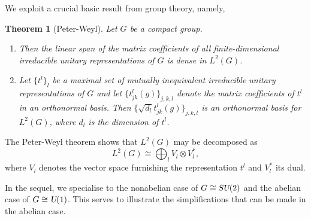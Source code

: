 \documentclass[12pt]{amsart}
\def\su2{\textsl{SU}(2)}
\def\uone{\textsl{U}(1)}
\newtheorem{theorem}{Theorem}[section]
\theoremstyle{definition}
\theoremstyle{remark}
\numberwithin{equation}{section}
\begin{document}
We exploit a crucial basic result from group theory, namely,
\begin{theorem}[Peter-Weyl]
	Let $G$ be a compact group. 
	\begin{enumerate} 
	\item Then the linear span of the matrix coefficients of all finite-dimensional irreducible unitary representations of  $G$ is dense in $L^2(G)$. 
	\item Let $\{t^l\}_l$ be a maximal set of mutually inequivalent irreducible unitary representations of $G$ and let $\{t_{jk}^l(g)\}_{j,k,l}$ denote the matrix coefficients of $t^l$ in an orthonormal basis. Then $\{\sqrt{d_l} t_{jk}^l(g)\}_{j,k,l}$ is an orthonormal basis for $L^2(G)$, where $d_l$ is the dimension of $t^l$.
	\end{enumerate}
\end{theorem}
The Peter-Weyl theorem shows that $L^2(G)$ may be decomposed as
\begin{equation}
	L^2(G) \cong \bigoplus_{l} V_l\otimes V_l^*,
\end{equation}
where $V_l$ denotes the vector space furnishing the representation $t^l$ and $V^*_l$ its dual.

In the sequel, we specialise to the nonabelian case of $G \cong \su2$
and the abelian case of $G \cong \uone$. This serves to illustrate the simplifications
that can be made in the abelian case.
\end{document}
